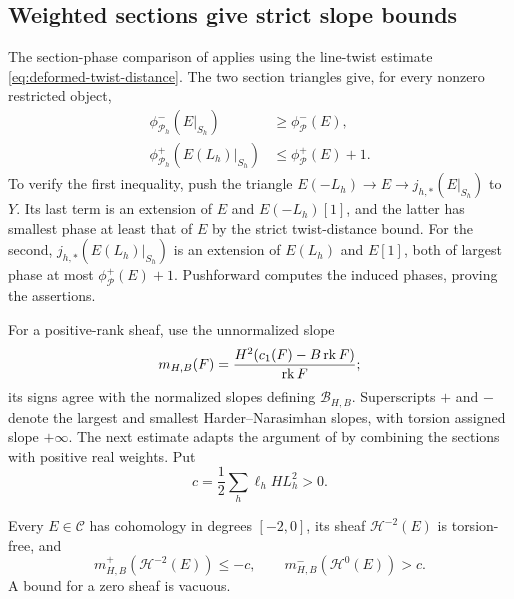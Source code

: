 \subsection{Weighted sections give strict slope bounds}

The section-phase comparison of
\cite[Lemma~3.1]{ChengFeyzbakhsh2026} applies using the line-twist
estimate \eqref{eq:deformed-twist-distance}. The two section triangles give, for every nonzero restricted object,
\begin{align}
 \phi^-_{\mathcal P_h}(E|_{S_h})
       &\ge\phi^-_{\mathcal P}(E),\label{eq:section-lower-phase}\\
 \phi^+_{\mathcal P_h}(E(L_h)|_{S_h})
       &\le\phi^+_{\mathcal P}(E)+1.\label{eq:section-upper-phase}
\end{align}
To verify the first inequality, push the triangle
$E(-L_h)\to E\to j_{h,*}(E|_{S_h})$ to $Y$.
Its last term is an extension of $E$ and $E(-L_h)[1]$, and the latter
has smallest phase at least that of $E$ by the strict twist-distance bound.
For the second, $j_{h,*}(E(L_h)|_{S_h})$ is an extension of $E(L_h)$ and
$E[1]$, both of largest phase at most $\phi^+_{\mathcal P}(E)+1$.
Pushforward computes the induced phases, proving the assertions.

For a positive-rank sheaf, use the unnormalized slope
\[
 m_{H,B}(F)=\frac{H^2(c_1(F)-B\operatorname{rk} F)}{\operatorname{rk} F};
\]
its signs agree with the normalized slopes defining
$\mathcal B_{H,B}$.  Superscripts $+$ and $-$ denote the largest and
smallest Harder--Narasimhan slopes, with torsion assigned slope $+\infty$.
The next estimate adapts the argument of
\cite[Proposition~3.3]{ChengFeyzbakhsh2026}
by combining the sections with positive real weights. Put
\begin{equation}\label{eq:weighted-slope-gap}
 c=\frac12\sum_h\ell_hHL_h^2>0.
\end{equation}

\begin{lemma}\label{lem:heart-cohomology-slopes}
Every $E\in\mathcal C$ has cohomology in degrees $[-2,0]$, its sheaf
$\mathcal H^{-2}(E)$ is torsion-free, and
\begin{equation}\label{eq:heart-sign-bounds}
 m^+_{H,B}(\mathcal H^{-2}(E))\le-c,
 \qquad m^-_{H,B}(\mathcal H^0(E))>c.
\end{equation}
A bound for a zero sheaf is vacuous.
\end{lemma}

